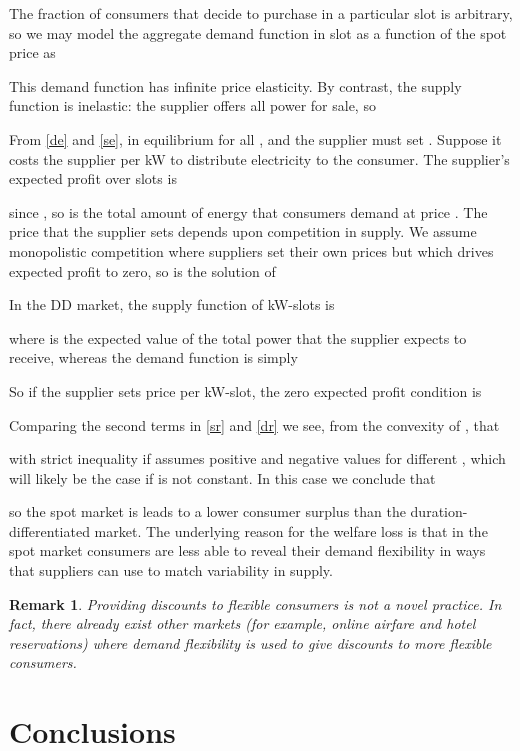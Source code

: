 \documentclass[10pt,draftcls,onecolumn]{IEEEtran}
\newtheorem{remark}{Remark}
\newcounter{l1}
\newcounter{l2}
\newcounter{l3}
\begin{document}
The fraction of consumers  that decide to purchase in a particular slot is arbitrary, so we may model the aggregate demand function in slot  as a function of the spot price  as

This demand function has infinite price elasticity.  By contrast, the supply function  is inelastic: the supplier offers all power for sale, so

From \eqref{de} and \eqref{se}, in equilibrium  for all , and the supplier must set .
Suppose it costs the supplier  per kW to distribute electricity to the consumer.  The supplier's expected profit over  slots is

since , so  is the total amount of energy that consumers  demand at price . The price  that the supplier  sets  depends upon competition in supply.  We assume monopolistic competition where suppliers set their own prices but  which drives expected profit to zero, so
 is the solution of

In the DD market, the supply function of kW-slots is

where  is the expected value of the total power  that the supplier expects to receive, whereas the demand function is simply 

So if the supplier sets  price  per kW-slot, the zero expected profit condition   is 

Comparing the second terms in \eqref{sr} and \eqref{dr} we see, from the convexity of , that 

with strict inequality if  assumes positive and negative values for different , which will likely be the case if
 is not constant.  In this case we conclude that

so the spot market is leads to a lower consumer surplus than the duration-differentiated market.  The underlying reason for the welfare loss is that in the spot market consumers are less able to reveal their demand flexibility in ways that suppliers can use to match variability in supply.
\begin{remark}
Providing discounts to flexible consumers is not a novel practice. In fact, there already exist other markets (for example, online airfare and hotel reservations) where demand flexibility is used to give discounts to more flexible consumers.
\end{remark}
\section{Conclusions} \label{sec-conclusions}
\end{document}
